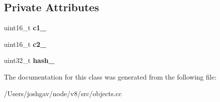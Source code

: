 \subsection*{Private Attributes}
\begin{DoxyCompactItemize}
\item 
uint16\+\_\+t {\bfseries c1\+\_\+}\hypertarget{classv8_1_1internal_1_1_two_char_hash_table_key_a24e390ecd614d754d97cda1b7cf8475a}{}\label{classv8_1_1internal_1_1_two_char_hash_table_key_a24e390ecd614d754d97cda1b7cf8475a}

\item 
uint16\+\_\+t {\bfseries c2\+\_\+}\hypertarget{classv8_1_1internal_1_1_two_char_hash_table_key_abce88532817be3702b5fd3380fcc7b18}{}\label{classv8_1_1internal_1_1_two_char_hash_table_key_abce88532817be3702b5fd3380fcc7b18}

\item 
uint32\+\_\+t {\bfseries hash\+\_\+}\hypertarget{classv8_1_1internal_1_1_two_char_hash_table_key_a29de2469d54f76c1ad5e4805890e67b8}{}\label{classv8_1_1internal_1_1_two_char_hash_table_key_a29de2469d54f76c1ad5e4805890e67b8}

\end{DoxyCompactItemize}


The documentation for this class was generated from the following file\+:\begin{DoxyCompactItemize}
\item 
/\+Users/joshgav/node/v8/src/objects.\+cc\end{DoxyCompactItemize}
